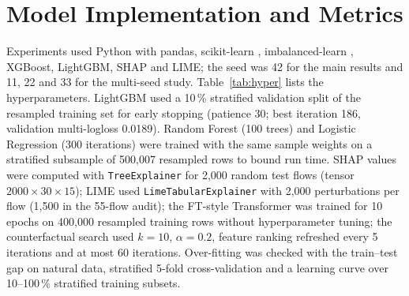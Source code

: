 \documentclass[11pt,a4paper]{article}
\begin{document}
\section{Model Implementation and Metrics}
\label{sec:impl}
\label{sec:metrics}

Experiments used Python with pandas, scikit-learn \parencite{pedregosa2011}, imbalanced-learn \parencite{lemaitre2017}, XGBoost, LightGBM, SHAP and LIME; the seed was 42 for the main results and 11, 22 and 33 for the multi-seed study. Table~\ref{tab:hyper} lists the hyperparameters. LightGBM used a 10\,\% stratified validation split of the resampled training set for early stopping (patience 30; best iteration 186, validation multi-logloss 0.0189). Random Forest (100 trees) and Logistic Regression (300 iterations) were trained with the same sample weights on a stratified subsample of 500{,}007 resampled rows to bound run time. SHAP values were computed with \texttt{TreeExplainer} for 2{,}000 random test flows (tensor $2000\times30\times15$); LIME used \texttt{LimeTabularExplainer} with 2{,}000 perturbations per flow (1{,}500 in the 55-flow audit); the FT-style Transformer was trained for 10 epochs on 400{,}000 resampled training rows without hyperparameter tuning; the counterfactual search used $k=10$, $\alpha=0.2$, feature ranking refreshed every 5 iterations and at most 60 iterations. Over-fitting was checked with the train--test gap on natural data, stratified 5-fold cross-validation and a learning curve over 10--100\,\% stratified training subsets.

\begin{table}[tbp]
\centering
\caption{Hyperparameters of the two detectors.}
\label{tab:hyper}
\scriptsize
{}
\end{table}
\end{document}

